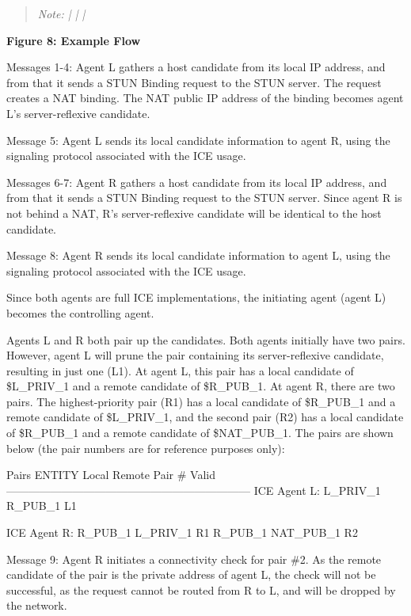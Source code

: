\documentclass{article}
\begin{document}
\begin{quote}
\textit{Note: |              |              |}
\end{quote}

\begin{center}
\textbf{Figure 8: Example Flow}
\end{center}

Messages 1-4: Agent L gathers a host candidate from its local IP address, and from that it sends a STUN Binding request to the STUN server.  The request creates a NAT binding.  The NAT public IP address of the binding becomes agent L's server-reflexive candidate.

Message 5: Agent L sends its local candidate information to agent R, using the signaling protocol associated with the ICE usage.

Messages 6-7: Agent R gathers a host candidate from its local IP address, and from that it sends a STUN Binding request to the STUN server.  Since agent R is not behind a NAT, R's server-reflexive candidate will be identical to the host candidate.

Message 8: Agent R sends its local candidate information to agent L, using the signaling protocol associated with the ICE usage.

Since both agents are full ICE implementations, the initiating agent (agent L) becomes the controlling agent.

Agents L and R both pair up the candidates.  Both agents initially have two pairs.  However, agent L will prune the pair containing its server-reflexive candidate, resulting in just one (L1).  At agent L, this pair has a local candidate of \$L\_PRIV\_1 and a remote candidate of \$R\_PUB\_1.  At agent R, there are two pairs.  The highest-priority pair (R1) has a local candidate of \$R\_PUB\_1 and a remote candidate of \$L\_PRIV\_1, and the second pair (R2) has a local candidate of \$R\_PUB\_1 and a remote candidate of \$NAT\_PUB\_1.  The pairs are shown below (the pair numbers are for reference purposes only):

Pairs ENTITY                   Local         Remote     Pair \#     Valid ------------------------------------------------------------------ ICE Agent L:             L\_PRIV\_1      R\_PUB\_1       L1

ICE Agent R:             R\_PUB\_1       L\_PRIV\_1      R1 R\_PUB\_1       NAT\_PUB\_1     R2

Message 9: Agent R initiates a connectivity check for pair \#2.  As the remote candidate of the pair is the private address of agent L, the check will not be successful, as the request cannot be routed from R to L, and will be dropped by the network.
\end{document}
